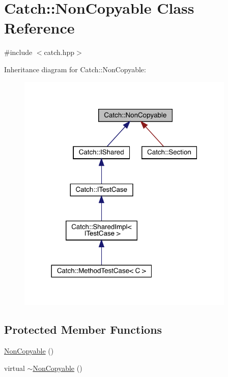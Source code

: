 \hypertarget{class_catch_1_1_non_copyable}{}\section{Catch\+:\+:Non\+Copyable Class Reference}
\label{class_catch_1_1_non_copyable}


{\ttfamily \#include $<$catch.\+hpp$>$}



Inheritance diagram for Catch\+:\+:Non\+Copyable\+:
\nopagebreak
\begin{figure}[H]
\begin{center}
\leavevmode
\includegraphics[width=294pt]{class_catch_1_1_non_copyable__inherit__graph}
\end{center}
\end{figure}
\subsection*{Protected Member Functions}
\begin{DoxyCompactItemize}
\item 
\hyperlink{class_catch_1_1_non_copyable_a4b492dd5753f9952350fb64dc6cb9fe2}{Non\+Copyable} ()
\item 
virtual \hyperlink{class_catch_1_1_non_copyable_a81254677280fef337eb4a676e91e3293}{$\sim$\+Non\+Copyable} ()
\end{DoxyCompactItemize}


